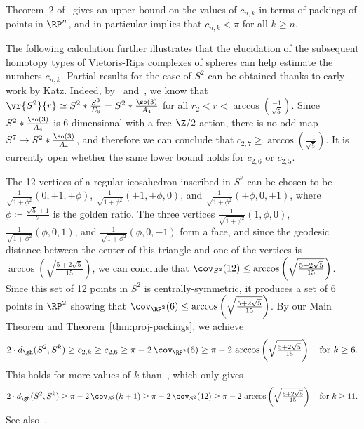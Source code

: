 \documentclass[11pt, reqno, english]{amsart}
\begin{document}
\begin{remark}
Theorem~2 of~\cite{ABF2} gives an upper bound on the values of $c_{n,k}$ in terms of packings of points in $\RP^n$, and in particular implies that $c_{n,k}<\pi$ for all $k\ge n$.
\end{remark}

\begin{remark}
\label{rem:c-2-7}
The following calculation further illustrates  that the elucidation of the subsequent homotopy types of Vietoris-Rips complexes of spheres can help estimate the numbers $c_{n,k}$.
Partial results for the case  of $S^2$ can be obtained thanks to early work by Katz.
Indeed, by~\cite[
Corollary 7]{lim2020vietoris} and~\cite{katz1989diameter,katz1991neighborhoods}, we know that $\vr{S^2}{r}\simeq S^2 * \tfrac{S^3}{E_6} = S^2 * \tfrac{\so(3)}{A_4}$ for all $r_2 < r < \arccos\left(\tfrac{-1}{\sqrt{5}}\right)$.
Since $S^2 * \tfrac{\so(3)}{A_4}$ is 6-dimensional with a free $\Z/2$ action, 
there is no odd map $S^7 \to S^2 * \tfrac{\so(3)}{A_4}$, and therefore we can conclude that $c_{2,7}\geq \arccos\left(\tfrac{-1}{\sqrt{5}}\right)$.
It is currently open whether the same lower bound holds for $c_{2,6}$ or $c_{2,5}$.
\end{remark}

\begin{remark}
\label{rem:icosahedron}
The 12 vertices of a regular icosahedron inscribed in $S^2$ can be chosen to be $\tfrac{1}{\sqrt{1+\phi^2}}(0,\pm 1,\pm\phi)$, $\tfrac{1}{\sqrt{1+\phi^2}}(\pm 1,\pm\phi,0)$, and $\tfrac{1}{\sqrt{1+\phi^2}}(\pm\phi,0,\pm 1)$, where $\phi\coloneqq\tfrac{\sqrt{5}+1}{2}$ is the golden ratio.
The three vertices $\tfrac{1}{\sqrt{1+\phi^2}}(1,\phi,0)$, $\tfrac{1}{\sqrt{1+\phi^2}}(\phi,0,1)$, and $\tfrac{1}{\sqrt{1+\phi^2}}(\phi,0,-1)$ form a face, and since the geodesic distance between the center of this triangle and one of the vertices is $\arccos\left(\sqrt{\tfrac{5+2\sqrt{5}}{15}}\right)$, we can conclude that $\cov_{S^2}(12)\leq \arccos\left(\sqrt{\tfrac{5+2\sqrt{5}}{15}}\right)$.
Since this set of 12 points in $S^2$ is centrally-symmetric, it produces a set of 6 points in $\RP^2$ showing that $\cov_{\RP^2}(6)\leq \arccos\left(\sqrt{\tfrac{5+2\sqrt{5}}{15}}\right)$.
By our Main Theorem and Theorem~\ref{thm:proj-packings}, we achieve
\[2\cdot d_{\gh}(S^2, S^k)\geq c_{2,k} \ge c_{2,6} \geq\pi-2\,\cov_{\RP^2}(6)\geq\pi-2\,\arccos\left(\sqrt{\tfrac{5+2\sqrt{5}}{15}}\right) \quad \text{for }k\ge 6.\]
This holds for more values of $k$ than~\cite[Proposition~1.11]{lim2021gromov}, which only gives
\[ 2\cdot d_{\gh}(S^2, S^k) \ge \pi - 2\,\cov_{S^2}(k+1) \ge \pi - 2\,\cov_{S^2}(12) \geq\pi-2\,\arccos\left(\sqrt{\tfrac{5+2\sqrt{5}}{15}}\right) \quad \text{for }k\ge 11.\]
See also~\cite[Example~4.5]{ABF2}.
\end{remark}
\end{document}
